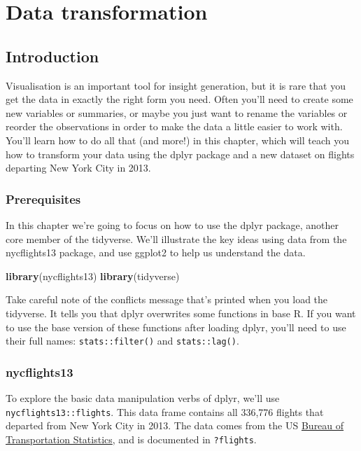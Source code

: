\documentclass[]{book}
\newenvironment{Shaded}{\begin{snugshade}}{\end{snugshade}}
\newcommand{\KeywordTok}[1]{\textcolor[rgb]{0.13,0.29,0.53}{\textbf{{#1}}}}
\newcommand{\NormalTok}[1]{{#1}}
\begin{document}
\hypertarget{transform}{\chapter{Data transformation}\label{transform}}

\section{Introduction}\label{introduction-2}

Visualisation is an important tool for insight generation, but it is
rare that you get the data in exactly the right form you need. Often
you'll need to create some new variables or summaries, or maybe you just
want to rename the variables or reorder the observations in order to
make the data a little easier to work with. You'll learn how to do all
that (and more!) in this chapter, which will teach you how to transform
your data using the dplyr package and a new dataset on flights departing
New York City in 2013.

\subsection{Prerequisites}\label{prerequisites-2}

In this chapter we're going to focus on how to use the dplyr package,
another core member of the tidyverse. We'll illustrate the key ideas
using data from the nycflights13 package, and use ggplot2 to help us
understand the data.

\begin{Shaded}
\begin{Highlighting}[]
\KeywordTok{library}\NormalTok{(nycflights13)}
\KeywordTok{library}\NormalTok{(tidyverse)}
\end{Highlighting}
\end{Shaded}

Take careful note of the conflicts message that's printed when you load
the tidyverse. It tells you that dplyr overwrites some functions in base
R. If you want to use the base version of these functions after loading
dplyr, you'll need to use their full names: \texttt{stats::filter()} and
\texttt{stats::lag()}.

\subsection{nycflights13}\label{nycflights13}

To explore the basic data manipulation verbs of dplyr, we'll use
\texttt{nycflights13::flights}. This data frame contains all 336,776
flights that departed from New York City in 2013. The data comes from
the US
\href{http://www.transtats.bts.gov/DatabaseInfo.asp?DB_ID=120\&Link=0}{Bureau
of Transportation Statistics}, and is documented in \texttt{?flights}.
\end{document}
